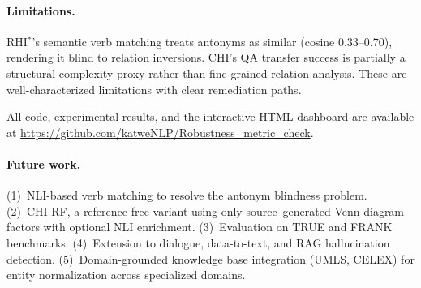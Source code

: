 \documentclass[11pt]{article}
\begin{document}
\paragraph{Limitations.} RHI$^*$'s semantic verb matching treats antonyms as similar (cosine 0.33--0.70), rendering it blind to relation inversions. CHI's QA transfer success is partially a structural complexity proxy rather than fine-grained relation analysis. These are well-characterized limitations with clear remediation paths.

All code, experimental results, and the interactive HTML dashboard are available at \url{https://github.com/katweNLP/Robustness_metric_check}.

\paragraph{Future work.} (1)~NLI-based verb matching to resolve the antonym blindness problem. (2)~CHI-RF, a reference-free variant using only source--generated Venn-diagram factors with optional NLI enrichment. (3)~Evaluation on TRUE and FRANK benchmarks. (4)~Extension to dialogue, data-to-text, and RAG hallucination detection. (5)~Domain-grounded knowledge base integration (UMLS, CELEX) for entity normalization across specialized domains.




\end{document}
